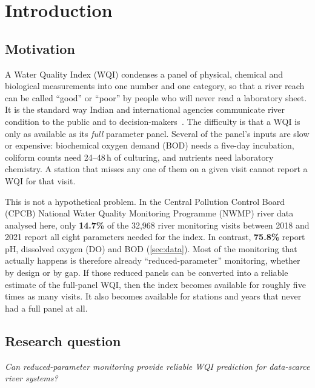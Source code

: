 \section{Introduction}
\label{sec:intro}

\subsection{Motivation}

A Water Quality Index (WQI) condenses a panel of physical, chemical and biological measurements into one number and one category, so that a river reach can be called ``good'' or ``poor'' by people who will never read a laboratory sheet. It is the standard way Indian and international agencies communicate river condition to the public and to decision-makers~\citep{horton1965,brown1970,tyagi2013,uddin2021}. The difficulty is that a WQI is only as available as its \emph{full} parameter panel. Several of the panel's inputs are slow or expensive: biochemical oxygen demand (BOD) needs a five-day incubation, coliform counts need 24--48\,h of culturing, and nutrients need laboratory chemistry. A station that misses any one of them on a given visit cannot report a WQI for that visit.

This is not a hypothetical problem. In the Central Pollution Control Board (CPCB) National Water Quality Monitoring Programme (NWMP) river data analysed here, only \textbf{14.7\%} of the 32,968 river monitoring visits between 2018 and 2021 report all eight parameters needed for the index. In contrast, \textbf{75.8\%} report pH, dissolved oxygen (DO) and BOD (\cref{sec:data}). Most of the monitoring that actually happens is therefore already ``reduced-parameter'' monitoring, whether by design or by gap. If those reduced panels can be converted into a reliable estimate of the full-panel WQI, then the index becomes available for roughly five times as many visits. It also becomes available for stations and years that never had a full panel at all.

\subsection{Research question}

\begin{keybox}
\emph{Can reduced-parameter monitoring provide reliable WQI prediction for data-scarce river systems?}
\end{keybox}

